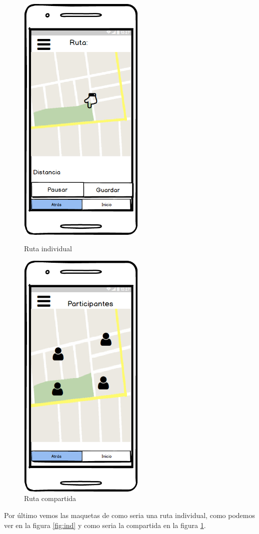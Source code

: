 	\begin{figure}[H]
\begin{minipage}[b]{0.5\linewidth} %
\centering
\includegraphics[width=6cm]{maqueta/Trayecto-actual.png}

\caption{Ruta individual}
\label{fig:ind}
\end{minipage}
\hspace{0.5cm} %
\begin{minipage}[b]{0.5\linewidth}
\centering
\includegraphics[width=6cm]{maqueta/Trayecto-actual-compartido.png}

\caption{Ruta compartida}
\label{fig:comp}
\end{minipage}
\end{figure}

Por último vemos las maquetas de como seria una ruta individual, como podemos ver en la figura \ref{fig:ind} y como seria la compartida en la figura \ref{fig:comp}.